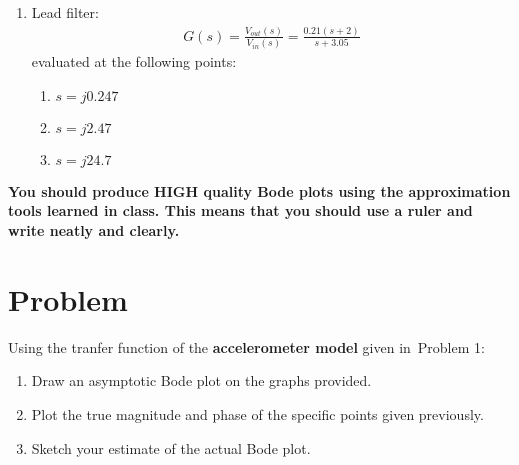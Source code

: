 \documentclass[11pt, reqno]{article}    %
\begin{document}
\begin{enumerate}
\begin{enumerate}
    \end{enumerate}
    \item Lead filter:
    \begin{align*}
        G(s) = \frac{V_{out}(s)}{V_{in}(s)} = \frac{0.21(s+2)}{s + 3.05}
    \end{align*}
    evaluated at the following points:
    \begin{enumerate}
        \item \( s = j 0.247\) 
        \item \( s = j 2.47\)
        \item \( s = j 24.7\)
    \end{enumerate}
\end{enumerate}

\clearpage

\noindent\textbf{You should produce HIGH quality Bode plots using the approximation tools learned in class. 
This means that you should use a ruler and write neatly and clearly.}

\section{Problem}
Using the tranfer function of the \textbf{accelerometer model} given in~Problem 1:
\begin{enumerate}
    \item Draw an asymptotic Bode plot on the graphs provided.
    \item Plot the true magnitude and phase of the specific points given previously.
    \item Sketch your estimate of the actual Bode plot.
\end{enumerate}
\end{document}

